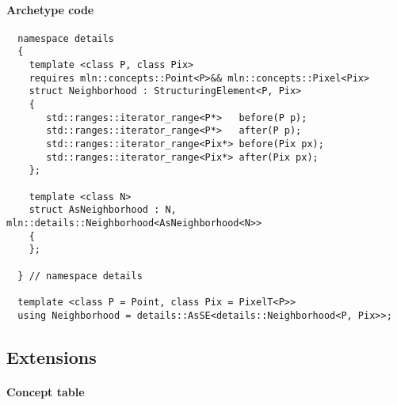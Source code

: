 \paragraph{Archetype code}

\begin{verbatim}
  namespace details
  {
    template <class P, class Pix>
    requires mln::concepts::Point<P>&& mln::concepts::Pixel<Pix>
    struct Neighborhood : StructuringElement<P, Pix>
    {
       std::ranges::iterator_range<P*>   before(P p);
       std::ranges::iterator_range<P*>   after(P p);
       std::ranges::iterator_range<Pix*> before(Pix px);
       std::ranges::iterator_range<Pix*> after(Pix px);
    };

    template <class N>
    struct AsNeighborhood : N, mln::details::Neighborhood<AsNeighborhood<N>>
    {
    };

  } // namespace details

  template <class P = Point, class Pix = PixelT<P>>
  using Neighborhood = details::AsSE<details::Neighborhood<P, Pix>>;
\end{verbatim}


\clearpage

\subsection{Extensions}

\paragraph{Concept table}



